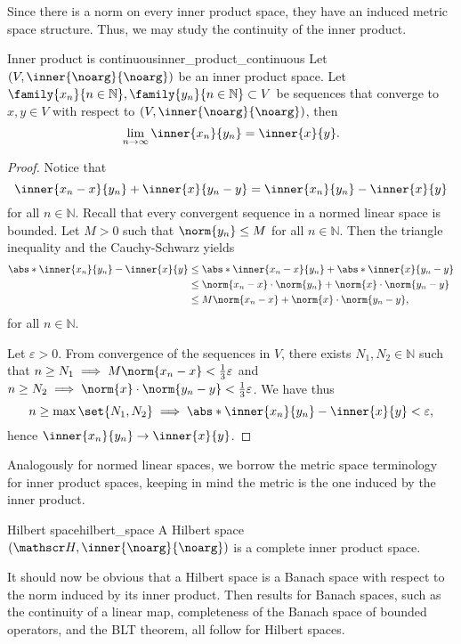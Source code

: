 Since there is a norm on every inner product space, they have an induced metric space structure. Thus, we may study the continuity of the inner product.
\begin{proposition}{Inner product is continuous}{inner_product_continuous}
    Let \((V, \inner{\noarg}{\noarg})\) be an inner product space. Let \(\family{x_n}{n\in \mathbb{N}}, \family{y_n}{n\in \mathbb{N}} \subset V\) be sequences that converge to \(x, y \in V\) with respect to \((V, \inner{\noarg}{\noarg})\), then
    \begin{equation*}
        \lim_{n\to\infty} \inner{x_n}{y_n} = \inner{x}{y}.
    \end{equation*}
\end{proposition}
\begin{proof}
    Notice that
    \begin{equation*}
        \inner{x_n - x}{y_n} + \inner{x}{y_n -y} = \inner{x_n}{y_n} - \inner{x}{y}
    \end{equation*}
    for all \(n \in \mathbb{N}\). Recall that every convergent sequence in a normed linear space is bounded. Let \(M > 0\) such that \(\norm{y_n} \leq M\) for all \(n \in \mathbb{N}\). Then the triangle inequality and the Cauchy-Schwarz yields
    \begin{align*}
        \abs*{\inner{x_n}{y_n} - \inner{x}{y}} &\leq \abs*{\inner{x_n - x}{y_n} + \abs*{\inner{x}{y_n - y}}}\\
                                               &\leq \norm{x_n - x}\cdot \norm{y_n} + \norm{x} \cdot\norm{y_n - y}\\
                                               &\leq M\norm{x_n - x} + \norm{x} \cdot \norm{y_n - y},
    \end{align*}
    for all \(n \in \mathbb{N}\).

    Let \(\varepsilon > 0\). From convergence of the sequences in \(V\), there exists \(N_1, N_2 \in \mathbb{N}\) such that \(n \geq N_1 \implies M \norm{x_n - x} < \frac13 \varepsilon\) and \(n \geq N_2 \implies \norm{x} \cdot \norm{y_n- y} < \frac13 \varepsilon\). We have thus
    \begin{equation*}
        n \geq \max\set{N_1, N_2} \implies \abs*{\inner{x_n}{y_n} - \inner{x}{y}} < \varepsilon,
    \end{equation*}
    hence \(\inner{x_n}{y_n}\to \inner{x}{y}\).
\end{proof}

Analogously for normed linear spaces, we borrow the metric space terminology for inner product spaces, keeping in mind the metric is the one induced by the inner product.
\begin{definition}{Hilbert space}{hilbert_space}
    A Hilbert space \((\hilbert, \inner{\noarg}{\noarg})\) is a complete inner product space.
\end{definition}
It should now be obvious that a Hilbert space is a Banach space with respect to the norm induced by its inner product. Then results for Banach spaces, such as the continuity of a linear map, completeness of the Banach space of bounded operators, and the BLT theorem, all follow for Hilbert spaces.
